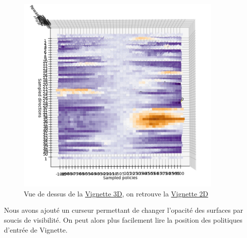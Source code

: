 \documentclass[12pt]{article}
\begin{document}
\begin{figure}[htp]
    \centering
    \includegraphics[width=10cm]{Images/vignette_dessus}
    \caption{Vue de dessus de la \hyperref[fig:vignette3D]{Vignette 3D}, on retrouve la \hyperref[fig:vignettePendulum]{Vignette 2D}}
    \label{fig:vignetteDessus}
\end{figure}

\newpage
Nous avons ajouté un curseur permettant de changer l'opacité des surfaces par soucis de visibilité. On peut alors plus facilement lire la position des politiques d'entrée de Vignette. \\
\end{document}
